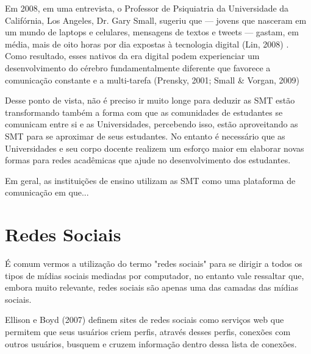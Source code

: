 Em 2008, em uma entrevista, o Professor de Psiquiatria da Universidade da Califórnia,
Los Angeles, Dr. Gary Small, sugeriu que — jovens que nasceram em um mundo de laptops
e celulares, mensagens de textos e tweets — gastam, em média, mais de oito horas
por dia expostas à tecnologia digital (Lin, 2008)
. Como resultado,
esses nativos da era digital podem experienciar um desenvolvimento do cérebro
fundamentalmente diferente que favorece a comunicação constante e a multi-tarefa
(Prensky, 2001; Small \& Vorgan, 2009)

Desse ponto de vista, não é preciso ir muito longe para deduzir as SMT estão
transformando também a forma com que as comunidades de estudantes se comunicam
entre si e as Universidades, percebendo isso, estão aproveitando as SMT para
se aproximar de seus estudantes. No entanto é necessário que as Universidades e
seu corpo docente realizem um esforço maior em elaborar novas formas para redes
acadêmicas que ajude no desenvolvimento dos estudantes.

Em geral, as instituições de ensino utilizam as SMT como uma plataforma de
comunicação em que... 


\section{Redes Sociais}

É comum vermos a utilização do termo "redes sociais" para se dirigir a todos os
tipos de mídias sociais mediadas por computador, no entanto vale ressaltar que,
embora muito relevante, redes sociais são apenas uma das camadas das mídias sociais.

Ellison e Boyd (2007) \cite{beer2008} definem sites de redes sociais como
serviços web que permitem que seus usuários criem perfis, através desses perfis,
conexões com outros usuários, busquem e cruzem informação dentro dessa lista de
conexões.

